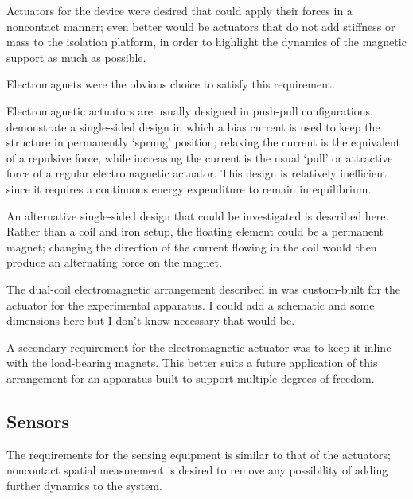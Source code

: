 Actuators for the device were desired that could apply their forces in a
noncontact manner; even better would be actuators that do not add stiffness or
mass to the isolation platform, in order to highlight the dynamics of the
magnetic support as much as possible.

Electromagnets were the obvious choice to satisfy this requirement.

Electromagnetic actuators are usually designed in push-pull configurations,
\textcite{nandi2009} demonstrate a single-sided design in which a bias current
is used to keep the structure in permanently `sprung' position; relaxing the
current is the equivalent of a repulsive force, while increasing the current
is the usual `pull' or attractive force of a regular electromagnetic actuator.
This design is relatively inefficient since it requires a continuous energy
expenditure to remain in equilibrium.

An alternative single-sided design that could be investigated is described
here. Rather than a coil and iron setup, the floating element could be a
permanent magnet; changing the direction of the current flowing in the coil
would then produce an alternating force on the magnet. 

The dual-coil electromagnetic arrangement described in  was
custom-built for the actuator for the experimental apparatus. I could add
a schematic and some dimensions here but I don't know necessary that would be.

A secondary requirement for the electromagnetic actuator was to keep it inline
with the load-bearing magnets. This better suits a future application of this
arrangement for an apparatus built to support multiple degrees of freedom.

\subsection{Sensors}

The requirements for the sensing equipment is similar to that
of the actuators; noncontact spatial measurement is desired
to remove any possibility of adding further dynamics to the system.

